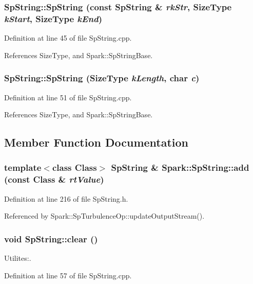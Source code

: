 \subsubsection{\setlength{\rightskip}{0pt plus 5cm}Sp\-String::Sp\-String (const {\bf Sp\-String} \& {\em rk\-Str}, {\bf Size\-Type} {\em k\-Start}, {\bf Size\-Type} {\em k\-End})}\label{classSpark_1_1SpString_a5}


Definition at line 45 of file Sp\-String.cpp.

References Size\-Type, and Spark::Sp\-String\-Base.
\subsubsection{\setlength{\rightskip}{0pt plus 5cm}Sp\-String::Sp\-String ({\bf Size\-Type} {\em k\-Length}, char {\em c})}\label{classSpark_1_1SpString_a6}


Definition at line 51 of file Sp\-String.cpp.

References Size\-Type, and Spark::Sp\-String\-Base.

\subsection{Member Function Documentation}
\subsubsection{\setlength{\rightskip}{0pt plus 5cm}template$<$class Class$>$ {\bf Sp\-String} \& Spark::Sp\-String::add (const Class \& {\em rt\-Value})}\label{classSpark_1_1SpString_a20}


Definition at line 216 of file Sp\-String.h.

Referenced by Spark::Sp\-Turbulence\-Op::update\-Output\-Stream().
\subsubsection{\setlength{\rightskip}{0pt plus 5cm}void Sp\-String::clear ()}\label{classSpark_1_1SpString_a19}


Utilites:. 

Definition at line 57 of file Sp\-String.cpp.
